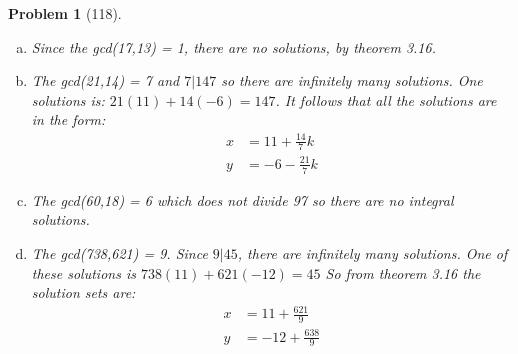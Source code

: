 \documentclass{article}
\theoremstyle{problem}
\newtheorem{prob}{Problem}
\theoremstyle{plain}
\theoremstyle{remark}
\begin{document}
%
\begin{prob}[118]
\begin{enumerate}[a)]
\item Since the gcd(17,13) = 1, there are no solutions, by theorem 3.16.
\item The gcd(21,14) = 7 and $7|147$ so there are infinitely many solutions. One solutions is: $21(11) + 14(-6) = 147$. It follows that all the solutions are in the form:
\begin{align*}
x &= 11 + \frac{14}{7}k\\
y &= -6 - \frac{21}{7}k
\end{align*}
\item The gcd(60,18) = 6 which does not divide 97 so there are no integral solutions.
\item The gcd(738,621) = 9. Since $9|45$, there are infinitely many solutions. One of these solutions is $738(11) + 621(-12) = 45$ So from theorem 3.16 the solution sets are:
\begin{align*}
  x &= 11 + \frac{621}{9}\\
  y &= -12 + \frac{638}{9}
\end{align*}
\end{enumerate}
\end{prob}
\end{document}
